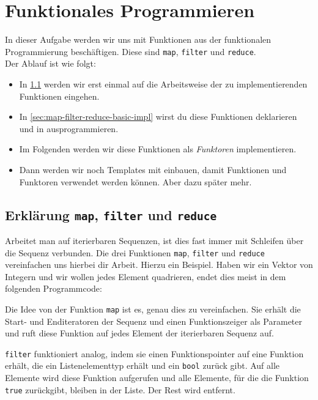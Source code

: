 \section{Funktionales Programmieren}

In dieser Aufgabe werden wir uns mit Funktionen aus der funktionalen Programmierung beschäftigen.
Diese sind \lstinline{map}, \lstinline{filter} und \lstinline{reduce}. \\

Der Ablauf ist wie folgt:
\begin{itemize}
    \item In \ref{sec:map-filter-reduce-intro} werden wir erst einmal auf die Arbeitsweise der zu implementierenden Funktionen eingehen.
    \item In \ref{sec:map-filter-reduce-basic-impl} wirst du diese Funktionen deklarieren und in  ausprogrammieren.
	\item Im Folgenden werden wir diese Funktionen als \emph{Funktoren} implementieren.
	\item Dann werden wir noch Templates mit einbauen, damit Funktionen und Funktoren verwendet werden können.
			Aber dazu später mehr.
\end{itemize}

\subsection{Erklärung \lstinline{map}, \lstinline{filter} und \lstinline{reduce}}\label{sec:map-filter-reduce-intro}

Arbeitet man auf iterierbaren Sequenzen, ist dies fast immer mit Schleifen über die Sequenz verbunden.
Die drei Funktionen \lstinline{map}, \lstinline{filter} und \lstinline{reduce} vereinfachen uns hierbei dir Arbeit.
Hierzu ein Beispiel.
Haben wir ein Vektor von Integern und wir wollen jedes Element quadrieren, endet dies meist in dem folgenden Programmcode:



Die Idee von der Funktion \lstinline{map} ist es, genau dies zu vereinfachen.
Sie erhält die Start- und Enditeratoren der Sequenz und einen Funktionszeiger als Parameter und ruft diese Funktion auf jedes Element der iterierbaren Sequenz auf.



\lstinline{filter} funktioniert analog, indem sie einen Funktionspointer auf eine Funktion erhält, die ein Listenelementtyp erhält und ein \lstinline{bool} zurück gibt.
Auf alle Elemente wird diese Funktion aufgerufen und alle Elemente, für die die Funktion \lstinline{true} zurückgibt, bleiben in der Liste. Der Rest wird entfernt. \\

